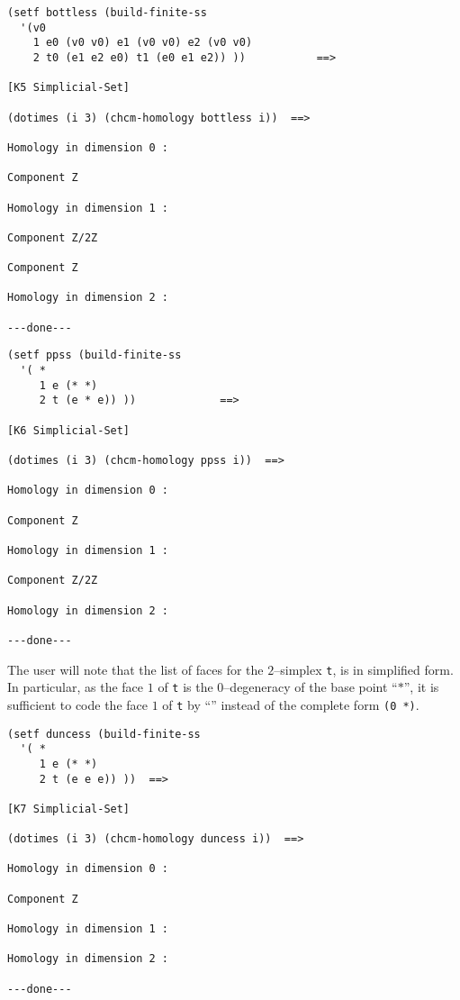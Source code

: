 \newpage
%
\vskip 0.40cm
\centerline{}
\vskip 0.40cm
%
{\footnotesize\begin{verbatim}
(setf bottless (build-finite-ss 
  '(v0
    1 e0 (v0 v0) e1 (v0 v0) e2 (v0 v0)
    2 t0 (e1 e2 e0) t1 (e0 e1 e2)) ))           ==>

[K5 Simplicial-Set]

(dotimes (i 3) (chcm-homology bottless i))  ==>

Homology in dimension 0 :

Component Z

Homology in dimension 1 :

Component Z/2Z

Component Z

Homology in dimension 2 :

---done---
\end{verbatim}}
\newpage
%
\vskip 0.40cm
\centerline{}
\vskip 0.40cm
%
{\footnotesize\begin{verbatim}
(setf ppss (build-finite-ss 
  '( *
     1 e (* *)
     2 t (e * e)) ))             ==>

[K6 Simplicial-Set]

(dotimes (i 3) (chcm-homology ppss i))  ==>

Homology in dimension 0 :

Component Z

Homology in dimension 1 :

Component Z/2Z

Homology in dimension 2 :

---done---
\end{verbatim}}
The user will note that the list of faces for the $2$--simplex {\tt t}, is
in simplified form. In particular, as the face $1$ of {\tt t} is the $0$--degeneracy
of the base point ``$*$'', it is sufficient to code the  face $1$ of {\tt t}
by ``{\tt *}'' instead of the complete form {\tt (0 *)}.
\newpage
%
\vskip 0.40cm
\centerline{}
\vskip 0.40cm
%
{\footnotesize\begin{verbatim}
(setf duncess (build-finite-ss 
  '( *
     1 e (* *)
     2 t (e e e)) ))  ==>
 
[K7 Simplicial-Set]

(dotimes (i 3) (chcm-homology duncess i))  ==>

Homology in dimension 0 :

Component Z

Homology in dimension 1 :

Homology in dimension 2 :

---done---
\end{verbatim}}
\newpage

